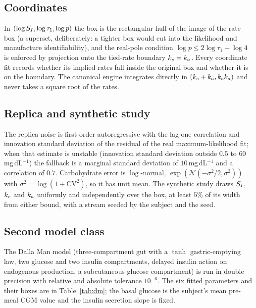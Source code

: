 \subsection{Coordinates}

In $(\log S_I,\log\tau_1,\log p)$ the box is the rectangular hull of the image of the rate box (a superset,
deliberately: a tighter box would cut into the likelihood and manufacture identifiability), and the real-pole
condition $\log p\le2\log\tau_1-\log 4$ is enforced by projection onto the tied-rate boundary $k_e=k_a$. Every
coordinate fit records whether its implied rates fall inside the original box and whether it is on the
boundary. The canonical engine integrates directly in $(k_e+k_a,k_ek_a)$ and never takes a square root of
the rates.

\subsection{Replica and synthetic study}

The replica noise is first-order autoregressive with the lag-one correlation and innovation standard
deviation of the residual of the real maximum-likelihood fit; when that estimate is unstable (innovation
standard deviation outside $0.5$ to $60$\,mg\,dL$^{-1}$) the fallback is a marginal standard deviation of
$10$\,mg\,dL$^{-1}$ and a correlation of $0.7$. Carbohydrate error is $\log$-normal,
$\exp(\mathcal N(-\sigma^2/2,\sigma^2))$ with $\sigma^2=\log(1+\mathrm{CV}^2)$, so it has unit mean. The
synthetic study draws $S_I$, $k_e$ and $k_a$ uniformly and independently over the box, at least $5\%$ of its
width from either bound, with a stream seeded by the subject and the seed.

\subsection{Second model class}

The Dalla Man model (three-compartment gut with a $\tanh$ gastric-emptying law, two glucose and two insulin
compartments, delayed insulin action on endogenous production, a subcutaneous glucose compartment) is run in
double precision with relative and absolute tolerance $10^{-6}$. The six fitted parameters and their boxes
are in Table~\ref{tab:dm}; the basal glucose is the subject's mean pre-meal CGM value and the insulin
secretion slope is fixed.

